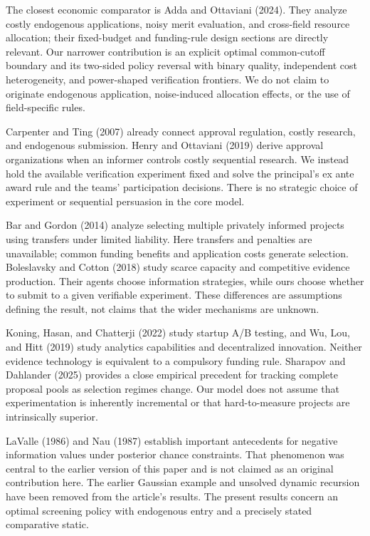 \documentclass[
  11pt,
]{article}
\begin{document}
The closest economic comparator is Adda and Ottaviani (2024). They
analyze costly endogenous applications, noisy merit evaluation, and
cross-field resource allocation; their fixed-budget and funding-rule
design sections are directly relevant. Our narrower contribution is an
explicit optimal common-cutoff boundary and its two-sided policy
reversal with binary quality, independent cost heterogeneity, and
power-shaped verification frontiers. We do not claim to originate
endogenous application, noise-induced allocation effects, or the use of
field-specific rules.

Carpenter and Ting (2007) already connect approval regulation, costly
research, and endogenous submission. Henry and Ottaviani (2019) derive
approval organizations when an informer controls costly sequential
research. We instead hold the available verification experiment fixed
and solve the principal's ex ante award rule and the teams'
participation decisions. There is no strategic choice of experiment or
sequential persuasion in the core model.

Bar and Gordon (2014) analyze selecting multiple privately informed
projects using transfers under limited liability. Here transfers and
penalties are unavailable; common funding benefits and application costs
generate selection. Boleslavsky and Cotton (2018) study scarce capacity
and competitive evidence production. Their agents choose information
strategies, while ours choose whether to submit to a given verifiable
experiment. These differences are assumptions defining the result, not
claims that the wider mechanisms are unknown.

Koning, Hasan, and Chatterji (2022) study startup A/B testing, and Wu,
Lou, and Hitt (2019) study analytics capabilities and decentralized
innovation. Neither evidence technology is equivalent to a compulsory
funding rule. Sharapov and Dahlander (2025) provides a close empirical
precedent for tracking complete proposal pools as selection regimes
change. Our model does not assume that experimentation is inherently
incremental or that hard-to-measure projects are intrinsically superior.

LaValle (1986) and Nau (1987) establish important antecedents for
negative information values under posterior chance constraints. That
phenomenon was central to the earlier version of this paper and is not
claimed as an original contribution here. The earlier Gaussian example
and unsolved dynamic recursion have been removed from the article's
results. The present results concern an optimal screening policy with
endogenous entry and a precisely stated comparative static.
\end{document}
